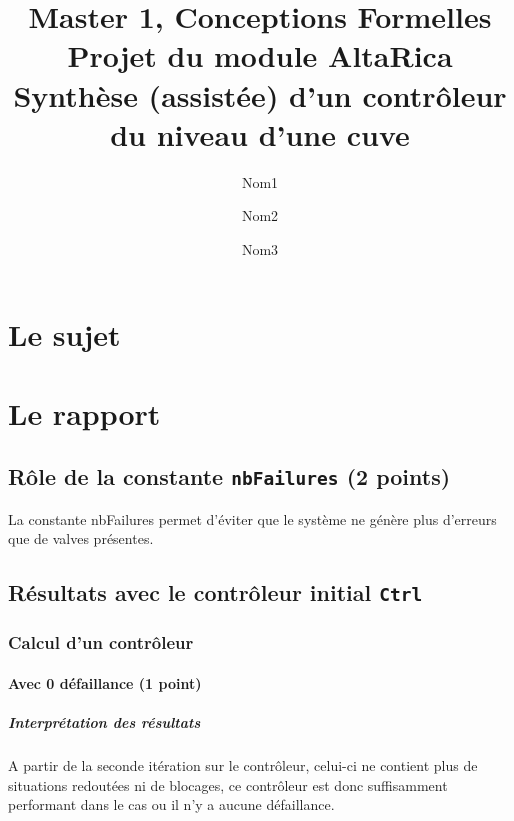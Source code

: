 \documentclass[a4paper]{book}
\newcommand{\altarica}{{\sc AltaRica}}
\begin{document}
\title{Master 1, Conceptions Formelles\\
Projet du module \altarica\\
Synthèse (assistée) d'un contrôleur du niveau d'une cuve}

\date{}

\author{Nom1 \and Nom2 \and Nom3}

\maketitle

\chapter{Le sujet}


\chapter{Le rapport}
\section{Rôle de la constante {\tt nbFailures} (2 points)}
La constante nbFailures permet d'éviter que le système ne génère plus d'erreurs que de valves présentes.

\section{Résultats avec le contrôleur initial {\tt Ctrl}}

\subsection{Calcul d'un contrôleur}

\subsubsection{Avec 0 défaillance (1 point)}





\paragraph{Interprétation des résultats}
A partir de la seconde itération sur le contrôleur, celui-ci ne contient plus de situations redoutées ni de blocages, ce contrôleur est donc suffisamment performant dans le cas ou il n'y a aucune défaillance.
\end{document}
